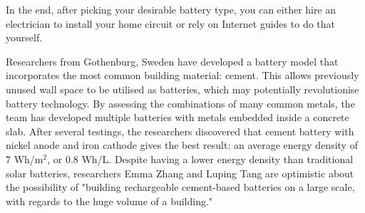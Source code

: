 \begin{multicols}{3}
In the end, after picking your desirable battery type, you can either hire an electrician to install your home circuit or rely on Internet guides to do that yourself. 
\closearticle


Researchers from Gothenburg, Sweden have developed a battery model that incorporates the most common building material: cement. This allows previously unused wall space to be utilised as batteries, which may potentially revolutionise battery technology. By assessing the combinations of many common metals, the team has developed multiple batteries with metals embedded inside a concrete slab. After several testings, the researchers discovered that cement battery with nickel anode and iron cathode gives the best result: an average energy density of 7 Wh/m$^{2}$, or 0.8 Wh/L. Despite having a lower energy density than traditional solar batteries, researchers Emma Zhang and Luping Tang are optimistic about the possibility of "building rechargeable cement-based batteries on a large scale, with regards to the huge volume of a building." 

\closearticle

\end{multicols}
\restoregeometry
